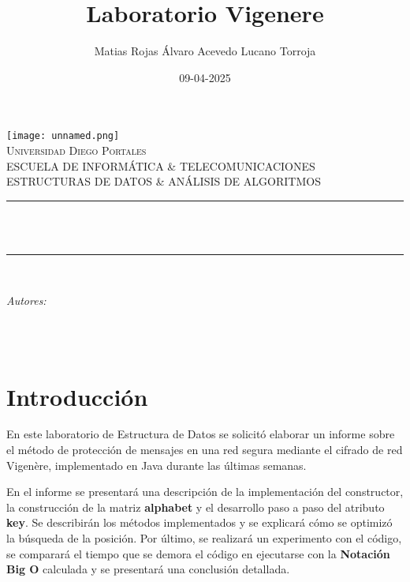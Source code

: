 \documentclass[12pt]{article}
\title{Laboratorio Vigenere}					%
\author{Matias Rojas \linebreak
Álvaro Acevedo\linebreak
Lucano Torroja\linebreak
\newline
\bttext{Profesor: \linebreak Marcos Fantoval}}
\date{09-04-2025}%
\makeatletter
\let\thetitle\@title
\let\theauthor\@author
\let\thedate\@date
\makeatother
\begin{document}

\begin{titlepage}
	\centering
    \vspace*{0.0 cm}
    \texttt{[image: unnamed.png]}\\[1.0 cm]	%
    \textsc{\LARGE Universidad Diego Portales}\\[0.2 cm]	%
	\textsc{\large ESCUELA DE INFORMÁTICA \& TELECOMUNICACIONES}\\[2 cm]		%
	\textsc{\LARGE ESTRUCTURAS DE DATOS \& ANÁLISIS DE ALGORITMOS}\\[1.0 cm]	%
	\rule{\linewidth}{0.2 mm} \\[0.4 cm]
	{ \huge \bfseries \thetitle}\\
	\rule{\linewidth}{0.2 mm} \\[1.5 cm]
	
	\begin{minipage}{1.0\textwidth}
		\begin{center} \large
			\emph{Autores:}\par
			\theauthor\linebreak
			\end{center}
	\end{minipage}\\[1.5 cm]	
	{\large \thedate}\\[1 cm]
 
	
\end{titlepage}

\pagebreak
\tableofcontents
\pagebreak

\section{Introducción}%

En este laboratorio de Estructura de Datos se solicitó elaborar un informe sobre el método de protección de mensajes en una red segura mediante el cifrado de red Vigenère, implementado en Java durante las últimas semanas.

En el informe se presentará una descripción de la implementación del constructor, la construcción de la matriz \textbf{alphabet} y el desarrollo paso a paso del atributo \textbf{key}. Se describirán los métodos implementados y se explicará cómo se optimizó la búsqueda de la posición. Por último, se realizará un experimento con el código, se comparará el tiempo que se demora el código en ejecutarse con la \textbf{Notación Big O} calculada y se presentará una conclusión detallada.
\end{document}
